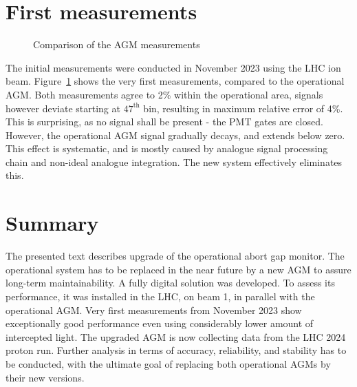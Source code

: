 \section{First measurements}

\vspace{-5mm}
\begin{figure}[!htb]
    \begin{center}
        \scalebox{0.54}{}
        \caption{Comparison of the AGM measurements}
        \label{fig:comparison_chart}
    \end{center}
\end{figure}

\vspace{-5mm}
The initial measurements were conducted in November 2023 using the LHC ion beam.
%
Figure~\ref{fig:comparison_chart} shows the very first measurements, compared to the operational AGM.
%
Both measurements agree to 2\% within the operational area, signals however deviate starting at $47^{\text{th}}$ bin, resulting in maximum relative error of 4\%.
%
This is surprising, as no signal shall be present - the PMT gates are closed. 
%
However, the operational AGM signal gradually decays, and extends below zero.
%
This effect is systematic, and is mostly caused by analogue signal processing chain and non-ideal analogue integration.
%
The new system effectively eliminates this.


\section{Summary}
The presented text describes upgrade of the operational abort gap monitor. 
%
The operational system has to be replaced in the near future by a new AGM to assure long-term maintainability.
%
A fully digital solution was developed.
%
To assess its performance, it was installed in the LHC, on beam 1, in parallel with the operational AGM.
%
Very first measurements from November 2023 show exceptionally good performance even using considerably lower amount of intercepted light.
%
The upgraded AGM is now collecting data from the LHC 2024 proton run.
%
Further analysis in terms of accuracy, reliability, and stability has to be conducted, with the ultimate goal of replacing both operational AGMs by their new versions.





